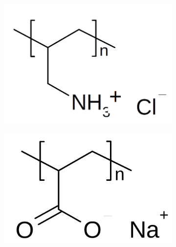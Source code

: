 \documentclass[journal=jacsat,manuscript=article]{achemso}
\begin{document}
\begin{figure}[H]
    \begin{subfigure}[b]{0.3\textwidth}
        \includegraphics[scale=0.4]{fig1A.png}
        \caption{}
        \label{fig:A}
    \end{subfigure}
    \begin{subfigure}[b]{0.3\textwidth}
        \includegraphics[scale=0.25]{fig1B.png}
        \caption{}
        \label{fig:B}
    \end{subfigure}
    \begin{subfigure}[b]{0.3\textwidth}

\end{subfigure}
\end{figure}
\end{document}
